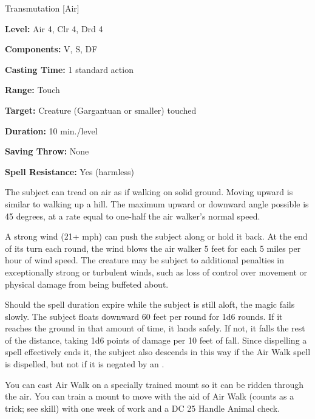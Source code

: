 
Transmutation [Air]

\textbf{Level:} Air 4, Clr 4, Drd 4

\textbf{Components:} V, S, DF

\textbf{Casting Time:} 1 standard action

\textbf{Range:} Touch

\textbf{Target:} Creature (Gargantuan or smaller) touched

\textbf{Duration:} 10 min./level

\textbf{Saving Throw:} None

\textbf{Spell Resistance:} Yes (harmless)

The subject can tread on air as if walking on solid ground. Moving upward is similar 
to walking up a hill. The maximum upward or downward angle possible is 45 degrees, 
at a rate equal to one-half the air walker's normal speed.

A strong wind (21+ mph) can push the subject along or hold it back. At the end 
of its turn each round, the wind blows the air walker 5 feet for each 5 miles per 
hour of wind speed. The creature may be subject to additional penalties in exceptionally 
strong or turbulent winds, such as loss of control over movement or physical damage 
from being buffeted about.

Should the spell duration expire while the subject is still aloft, the magic fails 
slowly. The subject floats downward 60 feet per round for 1d6 rounds. If it reaches 
the ground in that amount of time, it lands safely. If not, it falls the rest of 
the distance, taking 1d6 points of damage per 10 feet of fall. Since dispelling 
a spell effectively ends it, the subject also descends in this way if the Air Walk spell is dispelled, but not if it is negated by an .

You can cast Air Walk on a specially trained mount so it can be ridden 
through the air. You can train a mount to move with the aid of Air Walk (counts as a trick; see  skill) with one week of work and a DC 25 
Handle Animal check.

